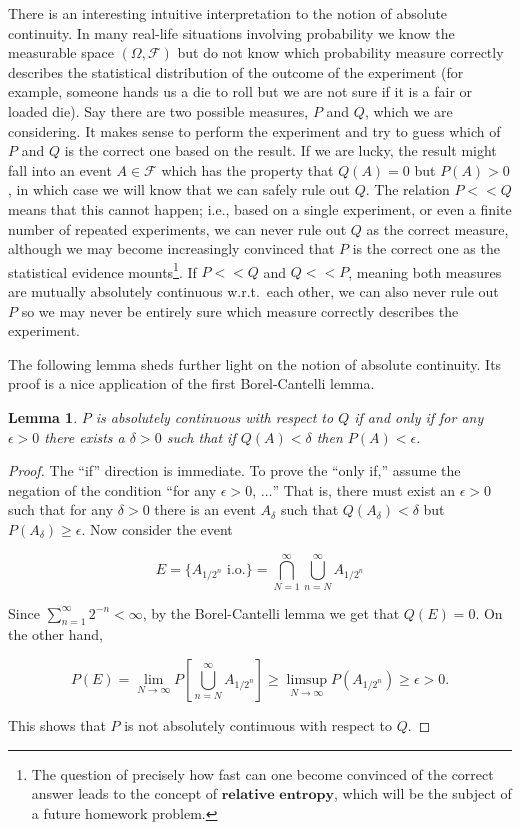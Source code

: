 \documentclass[11pt]{report}
\theoremstyle{plain}
\newtheorem{lem}[thm]{Lemma}
\theoremstyle{definition}
\begin{document}
\noindent There is an interesting intuitive interpretation to
the notion of absolute continuity. In many real-life
situations involving probability we know the
measurable space $(\Omega, \mathcal{F})$ but do not
know which probability measure correctly describes the
statistical distribution of the outcome of the
experiment (for example, someone hands us a die to
roll but we are not sure if it is a fair or loaded
die). Say there are two possible measures, $P$ and
$Q$, which we are considering. It makes sense to
perform the experiment and try to guess which of $P$
and $Q$ is the correct one based on the result. If we
are lucky, the result might fall into an event
$A \in \mathcal{F}$ which has the property that
$Q(A)=0$ but $P(A)>0$, in which case we will know
that we can safely rule out $Q$. The relation $P<<Q$
means that this cannot happen; i.e., based on a single
experiment, or even a finite number of repeated
experiments, we can never rule out $Q$ as the correct
measure, although we may become increasingly convinced
that $P$ is the correct one as the statistical
evidence mounts\footnote{The question of precisely how fast can one become
convinced of the correct answer leads to the concept
of $\textbf{relative entropy}$, which will be the
subject of a future homework problem.}. If $P<<Q$
and $Q<<P$, meaning both measures are mutually
absolutely continuous w.r.t.\ each other, we can also
never rule out $P$ so we may never be entirely sure
which measure correctly describes the experiment.

The following lemma sheds further light on the notion
of absolute continuity. Its proof is a nice
application of the first Borel-Cantelli lemma.

\begin{lem}
\label{lem-abs-cont}
$P$ is absolutely continuous with respect to $Q$ if
and only if for any $\epsilon>0$ there exists a
$\delta>0$ such that if $Q(A)<\delta$ then
$P(A)<\epsilon$.
\end{lem}

\begin{proof}
The ``if'' direction is immediate. To prove the
``only if,'' assume the negation of the condition
``for any $\epsilon>0$, $\ldots$'' That is, there
must exist an $\epsilon>0$ such that for any
$\delta>0$ there is an event $A_\delta$ such that
$Q(A_\delta)< \delta$ but $P(A_\delta)\ge\epsilon$.
Now consider the event

\[
E= \{ A_{1/{2^n}}\textrm{ i.o.} \} =  \bigcap_{N=1}^\infty \bigcup_{n=N}^\infty A_{1/2^n}
\]

\noindent Since $\sum_{n=1}^\infty 2^{-n}<\infty$, by the
Borel-Cantelli lemma we get that $Q(E)=0$. On the
other hand,

\[
P(E) = \lim_{N\to\infty} P\left[\bigcup_{n=N}^\infty A_{1/2^n}\right] \ge \limsup_{N\to\infty} P(A_{1/2^n}) \ge \epsilon>0.
\]

\noindent This shows that $P$ is not absolutely continuous with
respect to $Q$.
\end{proof}
\end{document}
